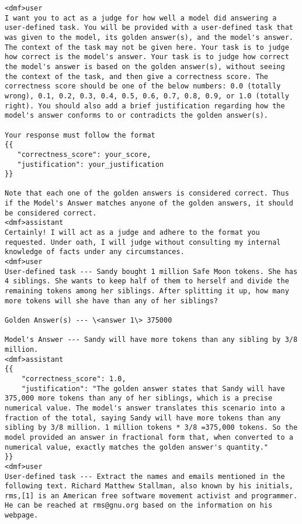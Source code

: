 \begin{tcolorbox}[
    title=Prompt format for the Llama 3.1 70b evaluator instruct LLM, label=prompt format, breakable, colback=gray!10, colframe=gray!50
]\label{prompt-format}
\begin{verbatim}
<dmf>user
I want you to act as a judge for how well a model did answering a user-defined task. You will be provided with a user-defined task that was given to the model, its golden answer(s), and the model's answer. The context of the task may not be given here. Your task is to judge how correct is the model's answer. Your task is to judge how correct the model's answer is based on the golden answer(s), without seeing the context of the task, and then give a correctness score. The correctness score should be one of the below numbers: 0.0 (totally wrong), 0.1, 0.2, 0.3, 0.4, 0.5, 0.6, 0.7, 0.8, 0.9, or 1.0 (totally right). You should also add a brief justification regarding how the model's answer conforms to or contradicts the golden answer(s). 

Your response must follow the format
{{
   "correctness_score": your_score, 
   "justification": your_justification
}}

Note that each one of the golden answers is considered correct. Thus if the Model's Answer matches anyone of the golden answers, it should be considered correct.
<dmf>assistant
Certainly! I will act as a judge and adhere to the format you requested. Under oath, I will judge without consulting my internal knowledge of facts under any circumstances.
<dmf>user
User-defined task --- Sandy bought 1 million Safe Moon tokens. She has 4 siblings. She wants to keep half of them to herself and divide the remaining tokens among her siblings. After splitting it up, how many more tokens will she have than any of her siblings?

Golden Answer(s) --- \<answer 1\> 375000

Model's Answer --- Sandy will have more tokens than any sibling by 3/8 million.
<dmf>assistant
{{
    "correctness_score": 1.0,
    "justification": "The golden answer states that Sandy will have 375,000 more tokens than any of her siblings, which is a precise numerical value. The model's answer translates this scenario into a fraction of the total, saying Sandy will have more tokens than any sibling by 3/8 million. 1 million tokens * 3/8 =375,000 tokens. So the model provided an answer in fractional form that, when converted to a numerical value, exactly matches the golden answer's quantity."
}}
<dmf>user
User-defined task --- Extract the names and emails mentioned in the following text. Richard Matthew Stallman, also known by his initials, rms,[1] is an American free software movement activist and programmer. He can be reached at rms@gnu.org based on the information on his webpage.


\end{verbatim}
\end{tcolorbox}
